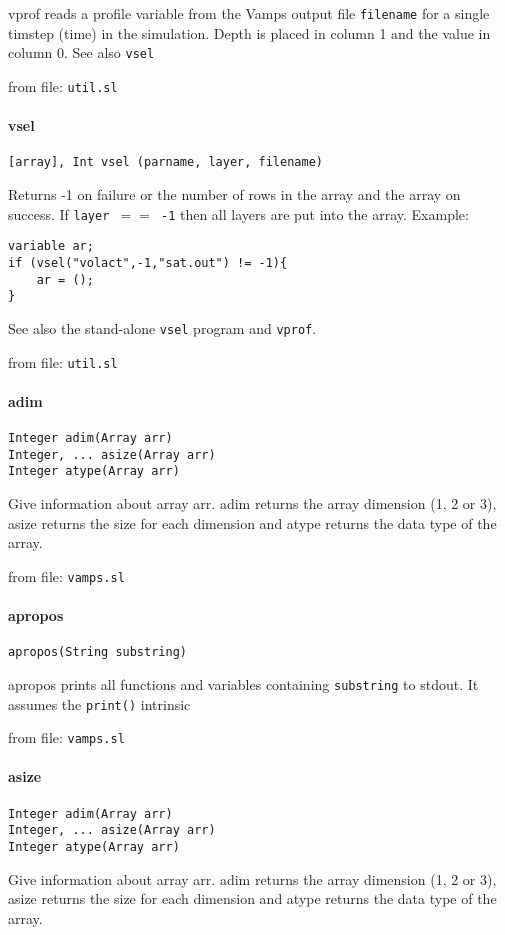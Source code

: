 vprof reads a profile variable from the Vamps output file
{\tt filename} for a single timstep (time) in the simulation.
Depth is placed in column 1 and the value in column 0.
See also {\tt vsel}

from file: {\tt util.sl}


\paragraph{vsel}
\begin{verbatim}
[array], Int vsel (parname, layer, filename)
\end{verbatim}
Returns -1 on failure or the number of rows
in the array and the array on success.
If {\tt layer $=$$=$ -1} then all layers are put into
the array.
Example:
\begin{verbatim}
variable ar;
if (vsel("volact",-1,"sat.out") != -1){
    ar = ();
}
\end{verbatim}
See also the stand-alone {\tt vsel} program and {\tt vprof}.

from file: {\tt util.sl}


\paragraph{adim}
\begin{verbatim}
Integer adim(Array arr)
Integer, ... asize(Array arr)
Integer atype(Array arr)
\end{verbatim}
Give information about array arr. adim returns the array
dimension (1, 2 or 3), asize returns the size for each
dimension and atype returns the data type of the array.

from file: {\tt vamps.sl}


\paragraph{apropos}
\begin{verbatim}
apropos(String substring)
\end{verbatim}
apropos prints all functions and variables containing {\tt substring} to
stdout. It assumes the {\tt print()} intrinsic

from file: {\tt vamps.sl}


\paragraph{asize}
\begin{verbatim}
Integer adim(Array arr)
Integer, ... asize(Array arr)
Integer atype(Array arr)
\end{verbatim}
Give information about array arr. adim returns the array
dimension (1, 2 or 3), asize returns the size for each
dimension and atype returns the data type of the array.

